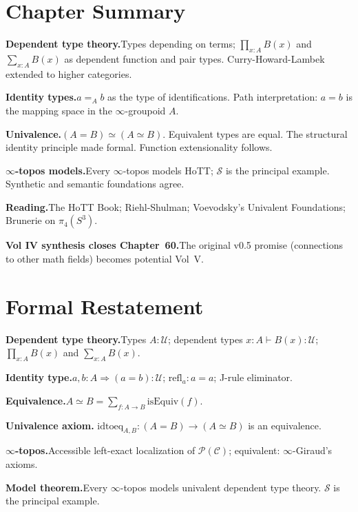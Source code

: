 \section*{Chapter Summary}

\begin{summarybox}
\textbf{Dependent type theory.}\quad Types depending on terms;
$\prod_{x:A} B(x)$ and $\sum_{x:A} B(x)$ as dependent function and pair
types. Curry-Howard-Lambek extended to higher categories.

\textbf{Identity types.}\quad $a =_A b$ as the type of identifications.
Path interpretation: $a = b$ is the mapping space in the $\infty$-groupoid $A$.

\textbf{Univalence.}\quad $(A = B) \simeq (A \simeq B)$. Equivalent types
are equal. The structural identity principle made formal. Function
extensionality follows.

\textbf{$\infty$-topos models.}\quad Every $\infty$-topos models HoTT;
$\mathcal{S}$ is the principal example. Synthetic and semantic
foundations agree.

\textbf{Reading.}\quad The HoTT Book; Riehl-Shulman; Voevodsky's
Univalent Foundations; Brunerie on $\pi_4(S^3)$.

\textbf{Vol IV synthesis closes Chapter~60.}\quad The original v0.5
promise (connections to other math fields) becomes potential Vol~V.
\end{summarybox}


\section*{Formal Restatement}

\begin{formalrestatement}
\textbf{Dependent type theory.}\quad Types $A : \mathcal{U}$;
dependent types $x : A \vdash B(x) : \mathcal{U}$;
$\prod_{x : A} B(x)$ and $\sum_{x : A} B(x)$.

\medskip
\textbf{Identity type.}\quad $a, b : A \Rightarrow (a = b) : \mathcal{U}$;
$\mathrm{refl}_a : a = a$; J-rule eliminator.

\medskip
\textbf{Equivalence.}\quad $A \simeq B = \sum_{f : A \to B} \mathrm{isEquiv}(f)$.

\medskip
\textbf{Univalence axiom.}\quad
$\mathrm{idtoeq}_{A, B} : (A = B) \to (A \simeq B)$ is an equivalence.

\medskip
\textbf{$\infty$-topos.}\quad Accessible left-exact localization of
$\mathcal{P}(\mathcal{C})$; equivalent: $\infty$-Giraud's axioms.

\medskip
\textbf{Model theorem.}\quad Every $\infty$-topos models univalent
dependent type theory. $\mathcal{S}$ is the principal example.
\end{formalrestatement}
